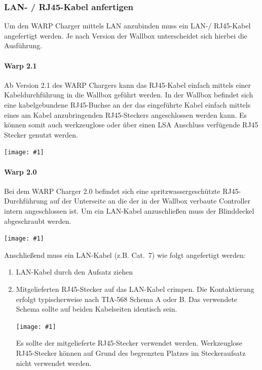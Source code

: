 \documentclass[a4paper,10pt]{article}
\newcommand{\hint}[1]{\begin{tcolorbox}[colback=boxgray,colframe=black,coltext=
white,title=Hinweis,left*=2mm,right*=2mm,boxsep=1mm,bottom=1mm,top=1mm]#1\end{tcolorbox}}
\newcommand{\gfx}[1]{\texttt{[image: \#1]}}
\begin{document}
\begin{multicols*}{2}
    \newpage
    \subsubsection{LAN- / RJ45-Kabel anfertigen}\label{ethernet}

    Um den WARP Charger mittels LAN anzubinden muss ein LAN-/ RJ45-Kabel
    angefertigt werden. Je nach Version der Wallbox unterscheidet sich hierbei
    die Ausführung.

    \paragraph{Warp 2.1}

    Ab Version 2.1 des WARP Chargers kann das RJ45-Kabel einfach mittels einer
    Kabeldurchführung in die Wallbox geführt werden. In der Wallbox befindet
    sich eine kabelgebundene RJ45-Buchse an der das eingeführte Kabel einfach
    mittels eines am Kabel anzubringenden RJ45-Steckers angeschlossen werden
    kann. Es können somit auch werkzeuglose oder über einen LSA Anschluss
    verfügende RJ45 Stecker genutzt werden.

    \gfx{./img_warp2/resized/warp2_1_top_ready_1000.jpg} %

    \paragraph{Warp 2.0}

    Bei dem WARP Charger 2.0 befindet sich eine spritzwassergeschützte
    RJ45-Durchführung auf der Unterseite an die der in der Wallbox verbaute Controller intern
    angeschlossen ist. Um ein LAN-Kabel anzuschließen muss der Blinddeckel
    abgeschraubt werden.

    \gfx{./img_warp2/resized/warp2_ethernet3_circle_600} %

    Anschließend muss ein LAN-Kabel (z.B. Cat.~7) wie folgt
    angefertigt werden:

    \columnbreak

    \begin{enumerate}
        \item LAN-Kabel durch den Aufsatz ziehen
        \item Mitgelieferten RJ45-Stecker auf das LAN-Kabel crimpen. Die
        Kontaktierung erfolgt typischerweise nach TIA-568 Schema A oder B.
        Das verwendete Schema sollte auf beiden Kabelseiten identisch sein.

        \gfx{./img_warp2/resized/warp2_rj45_1_600}
        \hint{Es sollte der mitgelieferte RJ45-Stecker verwendet werden. Werkzeuglose RJ45-Stecker können auf Grund des begrenzten
        Platzes im Steckeraufsatz nicht verwendet werden.}


\end{enumerate}
\end{multicols*}
\end{document}
